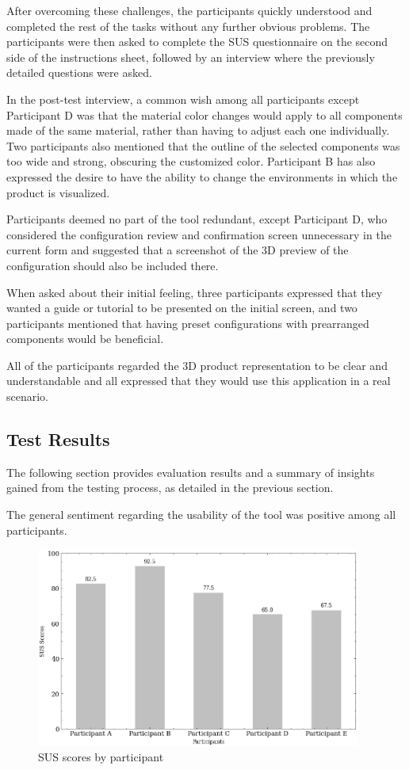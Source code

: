 After overcoming these challenges, the participants quickly understood and completed the rest of the tasks without any further obvious problems. The participants were then asked to complete the SUS questionnaire on the second side of the instructions sheet, followed by an interview where the previously detailed questions were asked.

In the post-test interview, a common wish among all participants except Participant D was that the material color changes would apply to all components made of the same material, rather than having to adjust each one individually. Two participants also mentioned that the outline of the selected components was too wide and strong, obscuring the customized color. Participant B has also expressed the desire to have the ability to change the environments in which the product is visualized.

Participants deemed no part of the tool redundant, except Participant D, who considered the configuration review and confirmation screen unnecessary in the current form and suggested that a screenshot of the 3D preview of the configuration should also be included there.

When asked about their initial feeling, three participants expressed that they wanted a guide or tutorial to be presented on the initial screen, and two participants mentioned that having preset configurations with prearranged components would be beneficial.  

All of the participants regarded the 3D product representation to be clear and understandable and all expressed that they would use this application in a real scenario.

\subsection{Test Results}

The following section provides evaluation results and a summary of insights gained from the testing process, as detailed in the previous section.

The general sentiment regarding the usability of the tool was positive among all participants.

\begin{figure}[h!]
\centering
\includegraphics[width=0.95\textwidth]{images/graph_sus.png}
\caption{SUS scores by participant}
\label{fig:sus-scores}
\end{figure}


